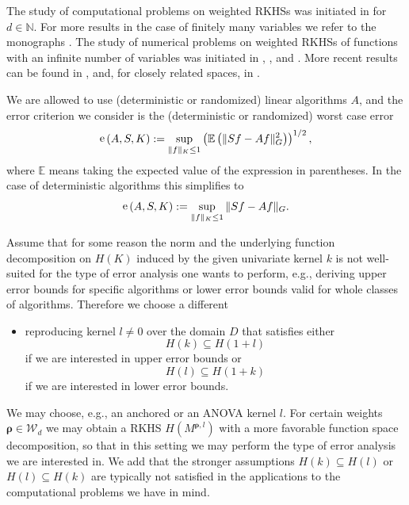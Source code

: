 \documentclass{article}
\newcommand{\N}  {{\mathbb N}}
\newcommand{\br}{{\boldsymbol{\rho}}}
\newcommand{\W}  {\mathcal{W}}
\newcommand{\EE}{\mathbb{E}}
\DeclareMathOperator{\err}{{\rm e}}
\theoremstyle{plain}
\theoremstyle{definition}
\begin{document}
The study of computational
problems on weighted RKHSs was initiated in \citet{SW98} for 
$d \in \N$. For more results in the case of finitely 
many variables we refer to the monographs \citet{NW08, NW10, NW12}.
The study of numerical problems on weighted RKHSs of functions with 
an infinite number of variables was initiated in \citet{HW01}, 
\citet{HMNR10}, and \citet{KSWW10a}. More recent results can be 
found in \citet{GHHR17}, and, for closely related spaces, in 
\citet{GHHRW2019, GHRR2024, GRR2024}.

We are allowed to use (deterministic or randomized) linear 
algorithms $A$, and the error criterion we consider is the 
(deterministic or randomized) worst case error
\[
\err \left( A, S, K \right) 
:= \sup_{\|f\|_{K} \le 1} 
\left(\EE \left( \| S f - A f\|^2_{G} \right) \right)^{1/2},
\]
where $\EE$ means 
taking the expected value of the expression in parentheses. 
In the case of deterministic algorithms this simplifies to
\[
\err \left( A, S, K \right) 
:= \sup_{\|f\|_{K} \le 1} 
\| S f - A f\|_{G}.
\]

Assume that for some reason the norm and the underlying function 
decomposition on $H(K)$ induced by the given univariate 
kernel $k$ is not well-suited for the type of error 
analysis one wants to perform, e.g., deriving upper error bounds for 
specific algorithms or lower error bounds valid for whole classes 
of algorithms.  Therefore we choose a different 
\begin{itemize}
\item[(B2)]
reproducing kernel $l \neq 0$ over the domain $D$
that satisfies either
\begin{equation}\label{inclusion_upper_bounds}
H(k) \subseteq H(1+l)
\end{equation}
if we are interested in upper error bounds or
\begin{equation}\label{inclusion_lower_bounds}
H(l) \subseteq H(1+k)
\end{equation}
if we are interested in lower error bounds.
\end{itemize}

We may choose, e.g., an anchored or an ANOVA kernel $l$. For
certain weights $\br \in \W_d$ we may obtain a RKHS 
$H(M^{\br,l})$ with a more favorable function space 
decomposition, so that in this setting we may perform the type of 
error analysis we are interested in. 
We add that the stronger assumptions
$H(k) \subseteq H(l)$ or $H(l) \subseteq H(k)$ are
typically not satisfied in the 
applications to the computational problems we have
in mind.
\end{document}
